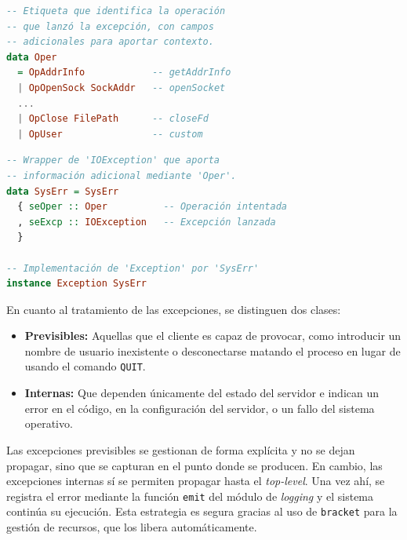 \documentclass[a4paper]{CSMakotoTechnicalReport}
\begin{document}
\vspace{-20pt}
\begin{minipage}[t]{0.40\textwidth}
\begin{lstlisting}[language=Haskell, frame=none, numbers=none, basicstyle=\footnotesize]
-- Etiqueta que identifica la operación
-- que lanzó la excepción, con campos
-- adicionales para aportar contexto.
data Oper
  = OpAddrInfo            -- getAddrInfo
  | OpOpenSock SockAddr   -- openSocket
  ... 
  | OpClose FilePath      -- closeFd
  | OpUser                -- custom
\end{lstlisting}
\vspace{-4pt}
\captionsetup{type=lstlisting}
\caption{Definición de Oper.}
\end{minipage}
\hfill
\begin{minipage}[t]{0.55\textwidth}
\begin{lstlisting}[language=Haskell, frame=none, numbers=none, basicstyle=\footnotesize]
-- Wrapper de 'IOException' que aporta
-- información adicional mediante 'Oper'.
data SysErr = SysErr
  { seOper :: Oper          -- Operación intentada
  , seExcp :: IOException   -- Excepción lanzada
  }

-- Implementación de 'Exception' por 'SysErr'
instance Exception SysErr
\end{lstlisting}
\vspace{-4pt}
\captionsetup{type=lstlisting}
\caption{Definición de SysErr.}
\end{minipage}
\vspace{6pt}

En cuanto al tratamiento de las excepciones, se distinguen dos clases: 

\begin{itemize}
    \item \textbf{Previsibles:} Aquellas que el cliente es capaz de provocar, como introducir un nombre de usuario inexistente o desconectarse matando el proceso en lugar de usando el comando \texttt{QUIT}.
    \item \textbf{Internas:} Que dependen únicamente del estado del servidor e indican un error en el código, en la configuración del servidor, o un fallo del sistema operativo.
\end{itemize}

Las excepciones previsibles se gestionan de forma explícita y no se dejan propagar, sino que se capturan en el punto donde se producen. En cambio, las excepciones internas sí se permiten propagar hasta el \textit{top-level}. Una vez ahí, se registra el error mediante la función \texttt{emit} del módulo de \textit{logging} y el sistema continúa su ejecución. Esta estrategia es segura gracias al uso de \texttt{bracket} para la gestión de recursos, que los libera automáticamente.
\end{document}
